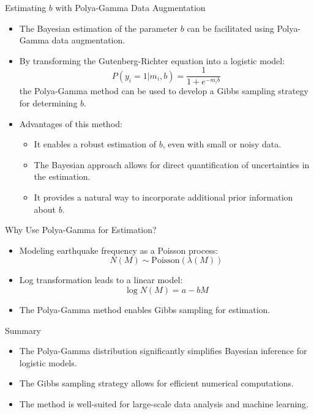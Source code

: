 \documentclass{beamer}
\begin{document}
	
	\begin{frame}{Estimating $b$ with Polya-Gamma Data Augmentation}
		\begin{itemize}
			\item The Bayesian estimation of the parameter $b$ can be facilitated using Polya-Gamma data augmentation.
			\item By transforming the Gutenberg-Richter equation into a logistic model:
			\begin{equation}
				P(y_i = 1 | m_i, b) = \frac{1}{1 + e^{-m_i b}}
			\end{equation}
			the Polya-Gamma method can be used to develop a Gibbs sampling strategy for determining $b$.
			\item Advantages of this method:
			\begin{itemize}
				\item It enables a robust estimation of $b$, even with small or noisy data.
				\item The Bayesian approach allows for direct quantification of uncertainties in the estimation.
				\item It provides a natural way to incorporate additional prior information about $b$.
			\end{itemize}
		\end{itemize}
	\end{frame}
	
	\begin{frame}{Why Use Polya-Gamma for Estimation?}
		\begin{itemize}
			\item Modeling earthquake frequency as a Poisson process:
			\[ N(M) \sim \text{Poisson}(\lambda(M)) \]
			
			\item Log transformation leads to a linear model:
			\[ \log N(M) = a - bM \]
			\item The Polya-Gamma method enables Gibbs sampling for estimation.
		\end{itemize}
	\end{frame}
	
	\begin{frame}{Summary}
		\begin{itemize}
			\item The Polya-Gamma distribution significantly simplifies Bayesian inference for logistic models.
			\item The Gibbs sampling strategy allows for efficient numerical computations.
			\item The method is well-suited for large-scale data analysis and machine learning.
		\end{itemize}
	\end{frame}
	
\end{document}
